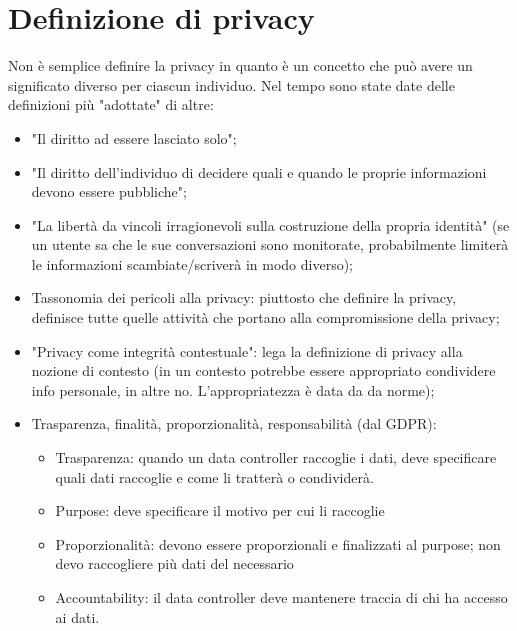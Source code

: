 \section{Definizione di privacy}
Non è semplice definire la privacy in quanto è un concetto che può avere un significato diverso per ciascun individuo. Nel tempo sono state date delle definizioni più "adottate" di altre:
\begin{itemize}
    \item "Il diritto ad essere lasciato solo";
    \item "Il diritto dell'individuo di decidere quali e quando le proprie informazioni devono essere pubbliche";
    \item "La libertà da vincoli irragionevoli sulla costruzione della propria identità" (se un utente sa che le sue conversazioni sono monitorate, probabilmente limiterà le informazioni scambiate/scriverà in modo diverso);
    \item Tassonomia dei pericoli alla privacy: piuttosto che definire la privacy, definisce tutte quelle attività che portano alla compromissione della privacy;
    \item "Privacy come integrità contestuale": lega la definizione di privacy alla nozione di contesto (in un contesto potrebbe essere appropriato condividere info personale, in altre no.  L’appropriatezza è data da da norme);
    \item Trasparenza, finalità, proporzionalità, responsabilità (dal GDPR):
    \begin{itemize}
        \item Trasparenza: quando un data controller raccoglie i dati, deve specificare quali dati raccoglie e come li tratterà o condividerà.
        \item Purpose: deve specificare il motivo per cui li raccoglie
        \item Proporzionalità: devono essere proporzionali e finalizzati al purpose; non devo raccogliere più dati del necessario
        \item Accountability: il data controller deve mantenere traccia di chi ha accesso ai dati.
    \end{itemize}
\end{itemize}

